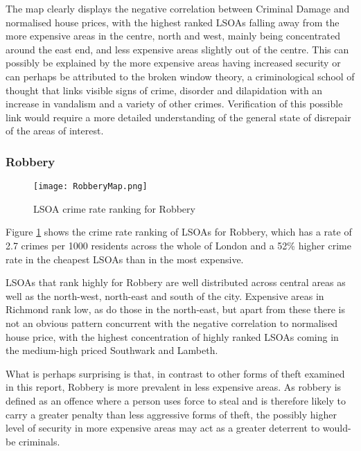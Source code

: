 \documentclass{article}
\begin{document}
The map clearly displays the negative correlation between Criminal Damage and normalised house prices, with the highest ranked LSOAs falling away from the more expensive areas in the centre, north and west, mainly being concentrated around the east end, and less expensive areas slightly out of the centre. This can possibly be explained by the more expensive areas having increased security or can perhaps be attributed to the broken window theory, a criminological school of thought that links visible signs of crime, disorder and dilapidation with an increase in vandalism and a variety of other crimes. Verification of this possible link would require a more detailed understanding of the general state of disrepair of the areas of interest.
\newline

\subsubsection{Robbery}
\begin{figure}[H]
\begin{center}
  \texttt{[image: RobberyMap.png]}
  \caption{LSOA crime rate ranking for Robbery}
  \label{fig:RobberyMap}
\end{center}
\end{figure}

Figure \ref{fig:RobberyMap} shows the crime rate ranking of LSOAs for Robbery, which has a rate of 2.7 crimes per 1000 residents across the whole of London and a 52\% higher crime rate in the cheapest LSOAs than in the most expensive.
\newline 

LSOAs that rank highly for Robbery are well distributed across central areas as well as the north-west, north-east and south of the city. Expensive areas in Richmond rank low, as do those in the north-east, but apart from these there is not an obvious pattern concurrent with the negative correlation to normalised house price, with the highest concentration of highly ranked LSOAs coming in the medium-high priced Southwark and Lambeth. 

What is perhaps surprising is that, in contrast to other forms of theft examined in this report, Robbery is more prevalent in less expensive areas. As robbery is defined as an offence where a person uses force to steal and is therefore likely to carry a greater penalty than less aggressive forms of theft, the possibly higher level of security in more expensive areas may act as a greater deterrent to would-be criminals.
\newline
\end{document}
